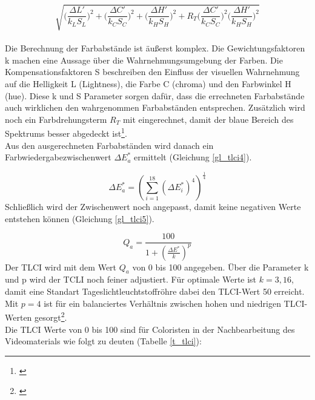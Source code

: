 \begin{equation}\label{gl_tlci3}
		\sqrt{ \Big(\frac{\Delta L'}{k_{L}S_{L}}\Big)^{2}+\Big(\frac{\Delta C'}{k_{C}S_{C}}\Big)^{2}+\Big(\frac{\Delta H'}{k_{H}S_{H}}\Big)^{2}+R_{T}\Big(\frac{\Delta C'}{k_{C}S_{C}}\Big)^{2} \Big(\frac{\Delta H'}{k_{H}S_{H}}\Big)^{2} }
\end{equation}\\

\noindent Die Berechnung der Farbabstände ist äußerst komplex. Die Gewichtungsfaktoren k machen eine Aussage über die Wahrnehmungsumgebung der Farben. Die Kompensationsfaktoren S beschreiben den Einfluss der visuellen Wahrnehmung auf die Helligkeit L (Lightness), die Farbe C (chroma) und den Farbwinkel H (hue). Diese k und S Parameter sorgen dafür, dass die errechneten Farbabstände auch wirklichen den wahrgenommen Farbabständen entsprechen. Zusätzlich wird noch ein Farbdrehungsterm $R_{T}$ mit eingerechnet, damit der blaue Bereich des Spektrums besser abgedeckt ist\footnote{\cite{yangmingyu}}.\\

\noindent Aus den ausgerechneten Farbabständen wird danach ein Farbwiedergabezwischenwert $\Delta E_{a} ^{*}$ ermittelt (Gleichung \ref{gl_tlci4}).

\begin{equation}\label{gl_tlci4}
		\Delta E_{a} ^{*} = \left( {\sum_{i=1}^{18}(\Delta E_{i} ^{*})^{4}}  \right)^{\frac{1}{4}} 
\end{equation}
Schließlich wird der Zwischenwert noch angepasst, damit keine negativen Werte entstehen können (Gleichung \ref{gl_tlci5}).

\begin{equation}\label{gl_tlci5}
		Q_{a} = \frac{100}{1+(\frac{\Delta E^{*}}{k})^{p}}
\end{equation}
Der TLCI wird mit dem Wert $Q_{a}$ von 0 bis 100 angegeben. Über die Parameter k und p wird der TCLI noch feiner adjustiert. Für optimale Werte ist $k = 3,16$, damit eine Standart Tageslichtleuchtstoffröhre dabei den TLCI-Wert 50 erreicht. Mit $p = 4$ ist für ein balanciertes Verhältnis zwischen hohen und niedrigen TLCI-Werten gesorgt\footnote{\cite[22]{roberts}}.\\
Die TLCI Werte von 0 bis 100 sind für Coloristen in der Nachbearbeitung des Videomaterials wie folgt zu deuten (Tabelle \ref{t_tlci}):

